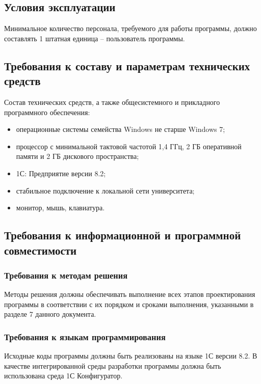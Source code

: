 \documentclass[utf8x]{article}
\begin{document}
\begin{flushleft}
\subsection{Условия эксплуатации}
Минимальное количество персонала, требуемого для работы программы, должно составлять 1 штатная единица – пользователь программы.

\subsection{Требования к составу и параметрам технических средств}

Состав технических средств, а также общесистемного и прикладного программного обеспечения:

\begin{itemize}

\item операционные системы семейства Windows не старше Windows 7;
\item процессор с минимальной тактовой частотой 1,4 ГГц, 2 ГБ оперативной памяти и 2 ГБ дискового пространства; 
\item 1С: Предприятие версии 8.2;
\item стабильное подключение к локальной сети университета;
\item монитор, мышь, клавиатура.
\end{itemize}

\subsection{Требования к информационной и программной совместимости}

\subsubsection{Требования к методам решения}

Методы решения должны обеспечивать выполнение всех этапов проектирования программы в соответствии с их порядком и сроками выполнения, указанными в разделе 7 данного документа.

\subsubsection{Требования к языкам программирования}

Исходные коды программы должны быть реализованы на языке 1С версии 8.2. В качестве интегрированной среды разработки программы должна быть использована среда 1С Конфигуратор.


\end{flushleft}
\end{document}
